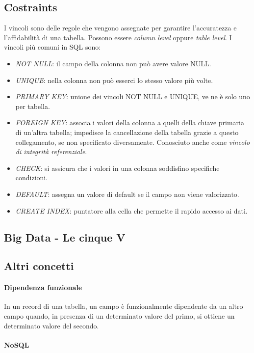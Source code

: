 \documentclass{article}
\begin{document}
    \subsection{Costraints}
        I vincoli sono delle regole che vengono assegnate per garantire l'accuratezza e l'affidabilità di una tabella. Possono essere \textit{column level} oppure \textit{table level}. I vincoli più comuni in SQL sono:
        \begin{itemize}
            \item \textit{NOT NULL}: il campo della colonna non può avere valore NULL.
            \item \textit{UNIQUE}: nella colonna non può esserci lo stesso valore più volte.
            \item \textit{PRIMARY KEY}: unione dei vincoli NOT NULL e UNIQUE, ve ne è solo uno per tabella.
            \item \textit{FOREIGN KEY}: associa i valori della colonna a quelli della chiave primaria di un'altra tabella; impedisce la cancellazione della tabella grazie a questo collegamento, se non specificato diversamente. Conosciuto anche come \textit{vincolo di integrità referenziale}.
            \item \textit{CHECK}: si assicura che i valori in una colonna soddisfino specifiche condizioni.
            \item \textit{DEFAULT}: assegna un valore di default se il campo non viene valorizzato.
            \item \textit{CREATE INDEX}: puntatore alla cella che permette il rapido accesso ai dati.
        \end{itemize}
    
    \subsection{Big Data - Le cinque V}
    
    \subsection{Altri concetti}
        \paragraph{Dipendenza funzionale} In un record di una tabella, un campo è funzionalmente dipendente da un altro campo quando, in presenza di un determinato valore del primo, si ottiene un determinato valore del secondo.
        \paragraph{NoSQL}
\end{document}
